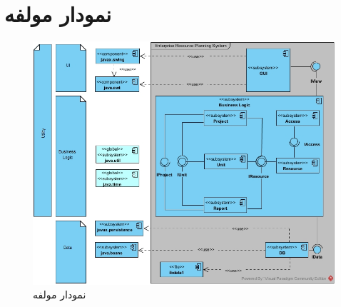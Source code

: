 
\chapter{نمودار مولفه}
\newpage
\begin{figure}[H]
	\centering
	\includegraphics[scale=0.6]{img/comp/ComponentDiagram}
	\caption{نمودار مولفه}
\end{figure}

